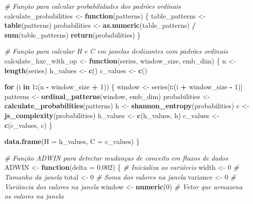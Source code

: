 \documentclass[
]{article}
\newenvironment{Shaded}{\begin{snugshade}}{\end{snugshade}}
\newcommand{\AttributeTok}[1]{\textcolor[rgb]{0.13,0.29,0.53}{#1}}
\newcommand{\CommentTok}[1]{\textcolor[rgb]{0.56,0.35,0.01}{\textit{#1}}}
\newcommand{\ControlFlowTok}[1]{\textcolor[rgb]{0.13,0.29,0.53}{\textbf{#1}}}
\newcommand{\DecValTok}[1]{\textcolor[rgb]{0.00,0.00,0.81}{#1}}
\newcommand{\FloatTok}[1]{\textcolor[rgb]{0.00,0.00,0.81}{#1}}
\newcommand{\FunctionTok}[1]{\textcolor[rgb]{0.13,0.29,0.53}{\textbf{#1}}}
\newcommand{\NormalTok}[1]{#1}
\newcommand{\OtherTok}[1]{\textcolor[rgb]{0.56,0.35,0.01}{#1}}
\newcommand{\SpecialCharTok}[1]{\textcolor[rgb]{0.81,0.36,0.00}{\textbf{#1}}}
\begin{document}
\begin{Shaded}
\begin{Highlighting}[]
\CommentTok{\# Função para calcular probabilidades dos padrões ordinais}
\NormalTok{calculate\_probabilities }\OtherTok{\textless{}{-}} \ControlFlowTok{function}\NormalTok{(patterns) \{}
\NormalTok{  table\_patterns }\OtherTok{\textless{}{-}} \FunctionTok{table}\NormalTok{(patterns)}
\NormalTok{  probabilities }\OtherTok{\textless{}{-}} \FunctionTok{as.numeric}\NormalTok{(table\_patterns) }\SpecialCharTok{/} \FunctionTok{sum}\NormalTok{(table\_patterns)}
  \FunctionTok{return}\NormalTok{(probabilities)}
\NormalTok{\}}

\CommentTok{\# Função para calcular H e C em janelas deslizantes com padrões ordinais}
\NormalTok{calculate\_hxc\_with\_op }\OtherTok{\textless{}{-}} \ControlFlowTok{function}\NormalTok{(series, window\_size, emb\_dim) \{}
\NormalTok{  n }\OtherTok{\textless{}{-}} \FunctionTok{length}\NormalTok{(series)}
\NormalTok{  h\_values }\OtherTok{\textless{}{-}} \FunctionTok{c}\NormalTok{()}
\NormalTok{  c\_values }\OtherTok{\textless{}{-}} \FunctionTok{c}\NormalTok{()}
  
  \ControlFlowTok{for}\NormalTok{ (i }\ControlFlowTok{in} \DecValTok{1}\SpecialCharTok{:}\NormalTok{(n }\SpecialCharTok{{-}}\NormalTok{ window\_size }\SpecialCharTok{+} \DecValTok{1}\NormalTok{)) \{}
\NormalTok{    window }\OtherTok{\textless{}{-}}\NormalTok{ series[i}\SpecialCharTok{:}\NormalTok{(i }\SpecialCharTok{+}\NormalTok{ window\_size }\SpecialCharTok{{-}} \DecValTok{1}\NormalTok{)]}
\NormalTok{    patterns }\OtherTok{\textless{}{-}} \FunctionTok{ordinal\_patterns}\NormalTok{(window, emb\_dim)}
\NormalTok{    probabilities }\OtherTok{\textless{}{-}} \FunctionTok{calculate\_probabilities}\NormalTok{(patterns)}
\NormalTok{    h }\OtherTok{\textless{}{-}} \FunctionTok{shannon\_entropy}\NormalTok{(probabilities)}
\NormalTok{    c }\OtherTok{\textless{}{-}} \FunctionTok{js\_complexity}\NormalTok{(probabilities)}
\NormalTok{    h\_values }\OtherTok{\textless{}{-}} \FunctionTok{c}\NormalTok{(h\_values, h)}
\NormalTok{    c\_values }\OtherTok{\textless{}{-}} \FunctionTok{c}\NormalTok{(c\_values, c)}
\NormalTok{  \}}
  
  \FunctionTok{data.frame}\NormalTok{(}\AttributeTok{H =}\NormalTok{ h\_values, }\AttributeTok{C =}\NormalTok{ c\_values)}
\NormalTok{\}}

\CommentTok{\# Função ADWIN para detectar mudanças de conceito em fluxos de dados}
\NormalTok{ADWIN }\OtherTok{\textless{}{-}} \ControlFlowTok{function}\NormalTok{(}\AttributeTok{delta =} \FloatTok{0.002}\NormalTok{) \{}
  \CommentTok{\# Inicializa as variáveis}
\NormalTok{  width }\OtherTok{\textless{}{-}} \DecValTok{0} \CommentTok{\# Tamanho da janela}
\NormalTok{  total }\OtherTok{\textless{}{-}} \DecValTok{0} \CommentTok{\# Soma dos valores na janela}
\NormalTok{  variance }\OtherTok{\textless{}{-}} \DecValTok{0} \CommentTok{\# Variância dos valores na janela}
\NormalTok{  window }\OtherTok{\textless{}{-}} \FunctionTok{numeric}\NormalTok{(}\DecValTok{0}\NormalTok{) }\CommentTok{\# Vetor que armazena os valores na janela}
  

\end{Highlighting}
\end{Shaded}
\end{document}
